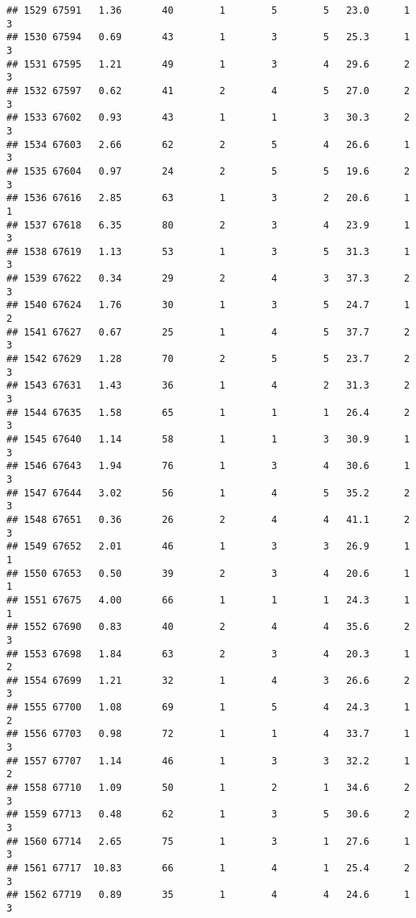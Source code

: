 \documentclass[
]{article}
\begin{document}
\begin{verbatim}
## 1529 67591   1.36       40        1        5        5   23.0      1      3
## 1530 67594   0.69       43        1        3        5   25.3      1      3
## 1531 67595   1.21       49        1        3        4   29.6      2      3
## 1532 67597   0.62       41        2        4        5   27.0      2      3
## 1533 67602   0.93       43        1        1        3   30.3      2      3
## 1534 67603   2.66       62        2        5        4   26.6      1      3
## 1535 67604   0.97       24        2        5        5   19.6      2      3
## 1536 67616   2.85       63        1        3        2   20.6      1      1
## 1537 67618   6.35       80        2        3        4   23.9      1      3
## 1538 67619   1.13       53        1        3        5   31.3      1      3
## 1539 67622   0.34       29        2        4        3   37.3      2      3
## 1540 67624   1.76       30        1        3        5   24.7      1      2
## 1541 67627   0.67       25        1        4        5   37.7      2      3
## 1542 67629   1.28       70        2        5        5   23.7      2      3
## 1543 67631   1.43       36        1        4        2   31.3      2      3
## 1544 67635   1.58       65        1        1        1   26.4      2      3
## 1545 67640   1.14       58        1        1        3   30.9      1      3
## 1546 67643   1.94       76        1        3        4   30.6      1      3
## 1547 67644   3.02       56        1        4        5   35.2      2      3
## 1548 67651   0.36       26        2        4        4   41.1      2      3
## 1549 67652   2.01       46        1        3        3   26.9      1      1
## 1550 67653   0.50       39        2        3        4   20.6      1      1
## 1551 67675   4.00       66        1        1        1   24.3      1      1
## 1552 67690   0.83       40        2        4        4   35.6      2      3
## 1553 67698   1.84       63        2        3        4   20.3      1      2
## 1554 67699   1.21       32        1        4        3   26.6      2      3
## 1555 67700   1.08       69        1        5        4   24.3      1      2
## 1556 67703   0.98       72        1        1        4   33.7      1      3
## 1557 67707   1.14       46        1        3        3   32.2      1      2
## 1558 67710   1.09       50        1        2        1   34.6      2      3
## 1559 67713   0.48       62        1        3        5   30.6      2      3
## 1560 67714   2.65       75        1        3        1   27.6      1      3
## 1561 67717  10.83       66        1        4        1   25.4      2      3
## 1562 67719   0.89       35        1        4        4   24.6      1      3

\end{verbatim}
\end{document}
